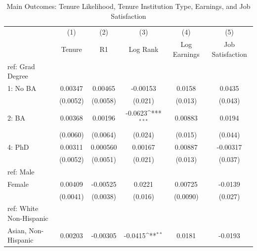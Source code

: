 \begin{table}[htbp]\centering
\def\sym#1{\ifmmode^{#1}\else\(^{#1}\)\fi}
\caption{Main Outcomes: Tenure Likelihood, Tenure Institution Type, Earnings, and Job Satisfaction \label{tab1}}
\begin{tabular}{l*{5}{c}}
\hline\hline
  &\multicolumn{1}{c}{(1)}&\multicolumn{1}{c}{(2)}&\multicolumn{1}{c}{(3)}&\multicolumn{1}{c}{(4)}&\multicolumn{1}{c}{(5)}\\
  &\multicolumn{1}{c}{Tenure}&\multicolumn{1}{c}{R1}&\multicolumn{1}{c}{Log Rank}&\multicolumn{1}{c}{Log Earnings}&\multicolumn{1}{c}{Job Satisfaction}\\
\hline
ref: Grad Degree&                     &                     &                     &                     &                     \\
[1em]
1: No BA&     0.00347         &     0.00465         &    -0.00153         &      0.0158         &      0.0435         \\
  &    (0.0052)         &    (0.0058)         &     (0.021)         &     (0.013)         &     (0.043)         \\
[1em]
2: BA&     0.00368         &     0.00196         &     -0.0623\sym{***}&     0.00883         &      0.0194         \\
  &    (0.0060)         &    (0.0064)         &     (0.024)         &     (0.015)         &     (0.044)         \\
[1em]
4: PhD&     0.00311         &    0.000560         &     0.00167         &     0.00887         &    -0.00317         \\
  &    (0.0052)         &    (0.0051)         &     (0.021)         &     (0.013)         &     (0.037)         \\
[1em]
ref: Male&                     &                     &                     &                     &                     \\
[1em]
Female&     0.00409         &    -0.00525         &      0.0221         &     0.00725         &     -0.0139         \\
  &    (0.0041)         &    (0.0038)         &     (0.016)         &    (0.0090)         &     (0.027)         \\
[1em]
ref: White Non-Hispanic&                     &                     &                     &                     &                     \\
[1em]
Asian, Non-Hispanic&     0.00203         &    -0.00305         &     -0.0415\sym{**} &      0.0181         &     -0.0193         \\

\end{tabular}
\end{table}
